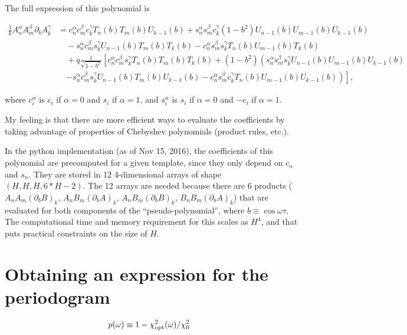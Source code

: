 \documentclass[notitlepage]{article}
\newcommand{\dA}{(\partial_b A)}
\newcommand{\dB}{(\partial_b B)}
\begin{document}
The full expression of this polynomial is 


\newcommand{\cna}{c_n^{\alpha}}
\newcommand{\cmb}{c_m^{\beta}}
\newcommand{\ckg}{c_k^{\gamma}}
\newcommand{\sna}{s_n^{\alpha}}
\newcommand{\smb}{s_m^{\beta}}
\newcommand{\skg}{s_k^{\gamma}}

\newcommand{\Tn}{T_n(b)}
\newcommand{\Tm}{T_m(b)}
\newcommand{\Tk}{T_k(b)}

\newcommand{\Un}{U_{n-1}(b)}
\newcommand{\Um}{U_{m-1}(b)}
\newcommand{\Uk}{U_{k-1}(b)}

\begin{align*}
\frac{1}{k}A^\alpha_n A^{\beta}_m \partial_b A_k^{\gamma} &= \cna\cmb\ckg \Tn\Tm\Uk + \sna\smb\ckg\left(1-b^2\right)\Un\Um\Uk \\
		&\quad - \sna\cmb\skg\Un\Tm\Tk - \cna\smb\skg\Tn\Um\Tk \\
		&\quad + q\frac{1}{\sqrt{1 - b^2}}\left[\cna\cmb\skg\Tn\Tm\Tk + \left(1-b^2\right)\left( \sna\smb\skg\Un\Um\Uk \right.\right.\\
		&\quad \left.\left. - \sna\cmb\skg\Un\Tm\Uk - \cna\smb\ckg\Tn\Um\Uk \right)\right],
\end{align*}

where $c_i^{\alpha}$ is $c_i$ if $\alpha=0$ and $s_i$ if $\alpha=1$, and $s_i^\alpha$ is $s_i$ if $\alpha=0$ and $-c_i$ if $\alpha=1$.

My feeling is that there are more efficient ways to evaluate the 
coefficients by taking advantage of properties of Chebyshev 
polynomials (product rules, etc.).

In the python implementation (as of Nov 15, 2016), the coefficients 
of this polynomial are precomputed for a given template, since
they only depend on $c_n$ and $s_n$. They are stored in 12 
4-dimensional arrays of shape $(H, H, H, 6*H - 2)$. 
The 12 arrays are needed because there are 6 products ($A_nA_m\dB_k$, 
$A_nB_m\dA_k$, $A_nB_m\dB_k$, $B_nB_m\dA_k$) that are evaluated for 
both components of the ``pseudo-polynomial'', where 
$b\equiv \cos\omega\tau$. The computational time and memory 
requirement for this scales as $H^4$, and that puts practical
constraints on the size of $H$.

\section{Obtaining an expression for the periodogram}

\begin{align*}
p(\omega) &\equiv 1 - \chi^2_{\rm opt}(\omega) / \chi^2_0
\end{align*}
\end{document}
